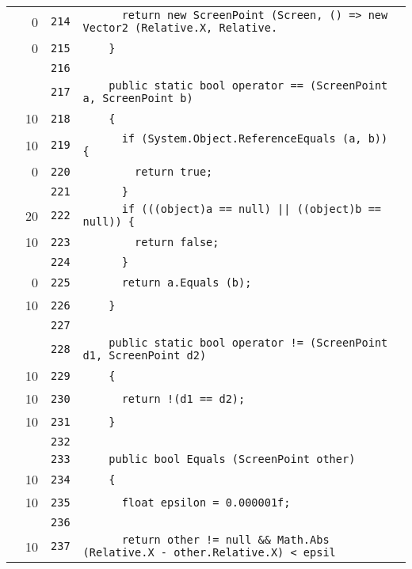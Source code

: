 \documentclass[a4paper,10pt]{article}
\begin{document}
\begin{longtable}[l]{lrrl}
\cellcolor{red} & 0 & \verb~214~ & \verb~      return new ScreenPoint (Screen, () => new Vector2 (Relative.X, Relative.~\\
\cellcolor{red} & 0 & \verb~215~ & \verb~    }~\\
\cellcolor{gray} &  & \verb~216~ & \verb~~\\
\cellcolor{gray} &  & \verb~217~ & \verb~    public static bool operator == (ScreenPoint a, ScreenPoint b)~\\
\cellcolor{green} & 10 & \verb~218~ & \verb~    {~\\
\cellcolor{green} & 10 & \verb~219~ & \verb~      if (System.Object.ReferenceEquals (a, b)) {~\\
\cellcolor{red} & 0 & \verb~220~ & \verb~        return true;~\\
\cellcolor{gray} &  & \verb~221~ & \verb~      }~\\
\cellcolor{green} & 20 & \verb~222~ & \verb~      if (((object)a == null) || ((object)b == null)) {~\\
\cellcolor{green} & 10 & \verb~223~ & \verb~        return false;~\\
\cellcolor{gray} &  & \verb~224~ & \verb~      }~\\
\cellcolor{red} & 0 & \verb~225~ & \verb~      return a.Equals (b);~\\
\cellcolor{green} & 10 & \verb~226~ & \verb~    }~\\
\cellcolor{gray} &  & \verb~227~ & \verb~~\\
\cellcolor{gray} &  & \verb~228~ & \verb~    public static bool operator != (ScreenPoint d1, ScreenPoint d2)~\\
\cellcolor{green} & 10 & \verb~229~ & \verb~    {~\\
\cellcolor{green} & 10 & \verb~230~ & \verb~      return !(d1 == d2);~\\
\cellcolor{green} & 10 & \verb~231~ & \verb~    }~\\
\cellcolor{gray} &  & \verb~232~ & \verb~~\\
\cellcolor{gray} &  & \verb~233~ & \verb~    public bool Equals (ScreenPoint other)~\\
\cellcolor{green} & 10 & \verb~234~ & \verb~    {~\\
\cellcolor{green} & 10 & \verb~235~ & \verb~      float epsilon = 0.000001f;~\\
\cellcolor{gray} &  & \verb~236~ & \verb~~\\
\cellcolor{green} & 10 & \verb~237~ & \verb~      return other != null && Math.Abs (Relative.X - other.Relative.X) < epsil~\\

\end{longtable}
\end{document}
